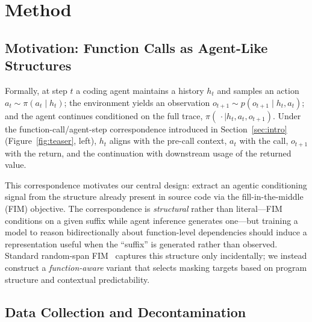 
\section{Method}
\label{sec:method}

\subsection{Motivation: Function Calls as Agent-Like Structures}
\label{sec:method:motivation}

Formally, at step $t$ a coding agent maintains a history $h_t$ and samples
an action $a_t \sim \pi(a_t \mid h_t)$; the environment yields an
observation $o_{t+1} \sim p(o_{t+1} \mid h_t, a_t)$; and the agent
continues conditioned on the full trace,
$\pi(\,\cdot \mid h_t, a_t, o_{t+1})$. Under the function-call/agent-step
correspondence introduced in Section~\ref{sec:intro}
(Figure~\ref{fig:teaser}, left), $h_t$ aligns with the pre-call context,
$a_t$ with the call, $o_{t+1}$ with the return, and the continuation with
downstream usage of the returned value.

This correspondence motivates our central design: extract an agentic
conditioning signal from the structure already present in source code via
the fill-in-the-middle (FIM) objective. The correspondence is
\emph{structural} rather than literal---FIM conditions on a given suffix
while agent inference generates one---but training a model to reason
bidirectionally about function-level dependencies should induce a
representation useful when the ``suffix'' is generated rather than
observed. Standard random-span
FIM~\citep{qwencoder, deepseekcoder, starcoder} captures this
structure only incidentally; we instead construct a \emph{function-aware}
variant that selects masking targets based on program structure and
contextual predictability.

\subsection{Data Collection and Decontamination}
\label{sec:method:data}

